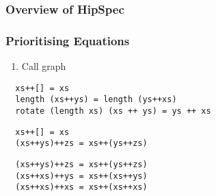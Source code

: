 \documentclass[serif,professionalfont]{beamer}
\newcommand\dn[0]{\vspace{\baselineskip}}
\begin{document}
\begin{frame}
  \frametitle{Overview of HipSpec}
  
\end{frame}


\begin{frame}[fragile]
  \frametitle{Prioritising Equations}

  \begin{overprint}
  \begin{minipage}{.5\linewidth}
  \begin{enumerate}
      \item Call graph
  \end{enumerate}
  \end{minipage}%
  \begin{minipage}{.5\linewidth}
  \end{minipage}

  \dn
  \dn



  \begin{verbatim}
  xs++[] = xs
  length (xs++ys) = length (ys++xs)
  rotate (length xs) (xs ++ ys) = ys ++ xs
  \end{verbatim}

  \begin{verbatim}
  xs++[] = xs
  (xs++ys)++zs = xs++(ys++zs)
  \end{verbatim}

  \begin{verbatim}
  (xs++ys)++zs = xs++(ys++zs)
  (xs++xs)++ys = xs++(xs++ys)
  (xs++xs)++xs = xs++(xs++xs)
  \end{verbatim}
  \end{overprint}

\end{frame}

\end{document}
